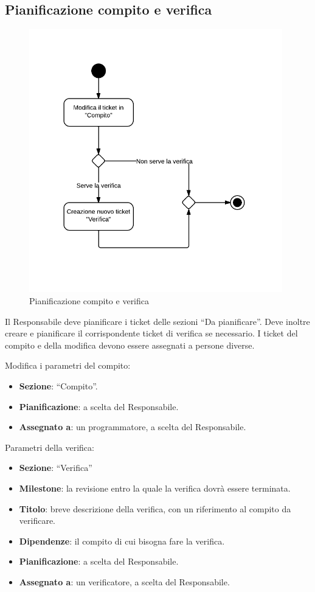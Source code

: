 \subsection{Pianificazione compito e verifica}
\label{pianificazione}

\begin{figure}[H]
    \centering
    \includegraphics[width=11cm]{uml-processi/Pianificazione_compito_e_verifica.png}
    \caption{Pianificazione compito e verifica}
\end{figure}

Il Responsabile deve pianificare i ticket delle sezioni ``Da pianificare''. Deve inoltre creare e pianificare il corrispondente ticket di verifica se necessario. I ticket del compito e della modifica devono essere assegnati a persone diverse.

Modifica i parametri del compito:
\begin{itemize}
 \item \textbf{Sezione}: ``Compito''.
 \item \textbf{Pianificazione}: a scelta del Responsabile.
 \item \textbf{Assegnato a}: un programmatore, a scelta del Responsabile.
\end{itemize}

Parametri della verifica:
\begin{itemize}
 \item \textbf{Sezione}: ``Verifica''
 \item \textbf{Milestone}: la revisione entro la quale la verifica dovrà essere terminata.
 \item \textbf{Titolo}: breve descrizione della verifica, con un riferimento al compito da verificare.
 \item \textbf{Dipendenze}: il compito di cui bisogna fare la verifica.
 \item \textbf{Pianificazione}: a scelta del Responsabile.
 \item \textbf{Assegnato a}: un verificatore, a scelta del Responsabile.
\end{itemize}

